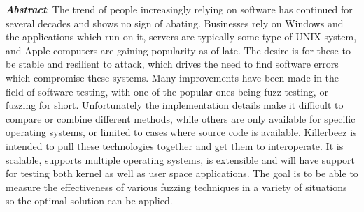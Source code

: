 \textbf{\textit{Abstract}}:
The trend of people increasingly relying on software has continued for
several decades and shows no sign of abating. Businesses rely on Windows and
the applications which run on it, servers are typically some type of UNIX
system, and Apple computers are gaining popularity as of late. The desire is
for these to be stable and resilient to attack, which drives the need to find
software errors which compromise these systems. Many improvements have been
made in the field of software testing, with one of the popular ones being fuzz
testing, or fuzzing for short.  Unfortunately the implementation details make
it difficult to compare or combine different methods, while others are only
available for specific operating systems, or limited to cases where source
code is available.  Killerbeez is intended to pull these technologies together
and get them to interoperate. It is scalable, supports multiple operating
systems, is extensible and will have support for testing both kernel as well
as user space applications. The goal is to be able to measure the effectiveness
of various fuzzing techniques in a variety of situations so the optimal
solution can be applied. 
